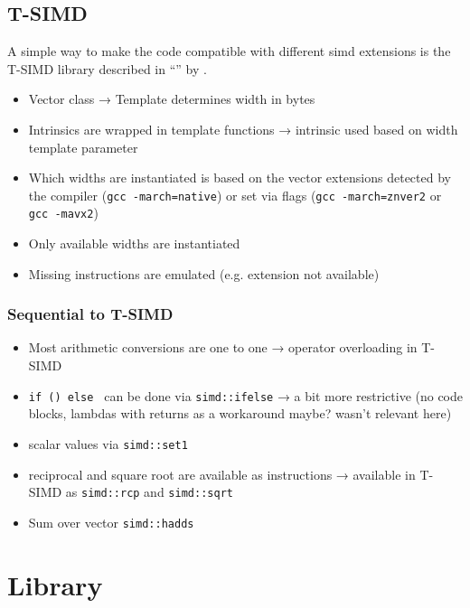 \documentclass[a4paper, 11pt]{memoir}
\begin{document}
    \subsection{T-SIMD}
    \label{sec:tsimd}
    A simple way to make the code compatible with different \gls{simd} extensions is the T-SIMD library described in
    \enquote{} \cite{own_moeller_16_2} by \citeauthor{own_moeller_16_2}.
    \begin{itemize}
        \item Vector class →  Template determines width in bytes
        \item Intrinsics are wrapped in template functions →  intrinsic used based on width template parameter
        \item Which widths are instantiated is based on the vector extensions detected by the compiler (\texttt{gcc -march=native}) or set via flags (\texttt{gcc -march=znver2} or \texttt{gcc -mavx2})
        \item Only available widths are instantiated
        \item Missing instructions are emulated (e.g. extension not available)
    \end{itemize}

    \subsubsection{Sequential to T-SIMD}
    \label{sec:seq_to_tsimd}
    \begin{itemize}
        \item Most arithmetic conversions are one to one →  operator overloading in T-SIMD
        \item \texttt{if () {} else {}} can be done via \texttt{simd::ifelse} →  a bit more restrictive (no code blocks, lambdas with returns as a workaround maybe? wasn't relevant here)
        \item scalar values via \texttt{simd::set1}
        \item reciprocal and square root are available as instructions →  available in T-SIMD as \texttt{simd::rcp} and \texttt{simd::sqrt}
        \item Sum over vector \texttt{simd::hadds}
    \end{itemize}

    \section{Library}
    \label{sec:library}
\end{document}
